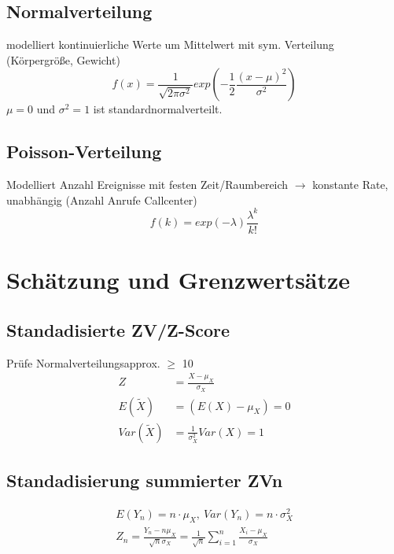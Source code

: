 \documentclass[10pt,a4paper,landscape]{article}
\begin{document}
\begin{multicols}{4}
\subsection{Normalverteilung}
modelliert kontinuierliche Werte um Mittelwert mit sym. Verteilung (Körpergröße, Gewicht) \\

\[
f(x)=\frac{1}{\sqrt{2 \pi \sigma^2}}exp\left(-\frac{1}{2}\frac{(x-\mu)^2}{\sigma^2}\right)
\]
$\mu = 0$ und $\sigma^2 = 1$ ist standardnormalverteilt.


\subsection{Poisson-Verteilung}
Modelliert Anzahl Ereignisse mit festen Zeit/Raumbereich $\rightarrow$ konstante Rate, unabhängig (Anzahl Anrufe Callcenter)
\[
f(k)=exp(-\lambda)\frac{\lambda^k}{k!}
\]



\section{Schätzung und Grenzwertsätze}

\subsection{Standadisierte ZV/Z-Score}
Prüfe Normalverteilungsapprox. $\geq$ 10
\begin{align*}
Z &= \frac{X- \mu_X}{\sigma_X} \\
E(\tilde{X}) &= (E(X)-\mu_X)=0 \\
Var(\tilde{X})&=\frac{1}{\sigma^2_X}Var(X) = 1
\end{align*}

\subsection{Standadisierung summierter ZVn}
\begin{align*}
E(Y_n) = n \cdot \mu_X, ~ Var(Y_n)= n \cdot \sigma_X^2 \\
Z_n = \frac{Y_n - n\mu_X}{\sqrt{n}\sigma_X}=\frac{1}{\sqrt{n}}\sum_{i=1}^n \frac{X_i-\mu_X}{\sigma_X}
\end{align*}


\end{multicols}
\end{document}
